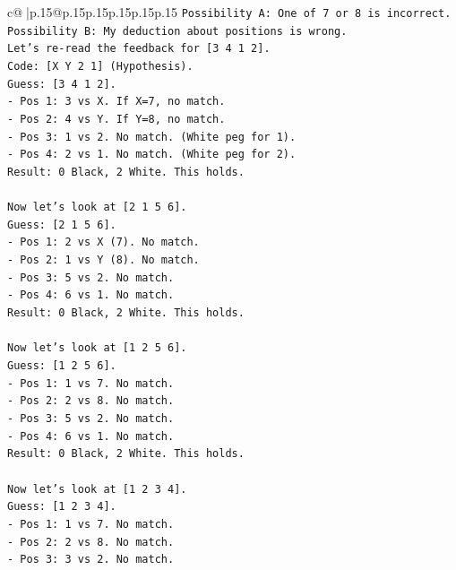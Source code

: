 \documentclass{article}
\begin{document}
{\begin{supertabular}{c@{$\;$}|p{.15\linewidth}@{}p{.15\linewidth}p{.15\linewidth}p{.15\linewidth}p{.15\linewidth}p{.15\linewidth}}
{{{\texttt{Possibility A: One of 7 or 8 is incorrect.} \\
\texttt{Possibility B: My deduction about positions is wrong.} \\
\texttt{Let's re{-}read the feedback for {[}3 4 1 2{]}.} \\
\texttt{Code: {[}X Y 2 1{]} (Hypothesis).} \\
\texttt{Guess: {[}3 4 1 2{]}.} \\
\texttt{{-} Pos 1: 3 vs X. If X=7, no match.} \\
\texttt{{-} Pos 2: 4 vs Y. If Y=8, no match.} \\
\texttt{{-} Pos 3: 1 vs 2. No match. (White peg for 1).} \\
\texttt{{-} Pos 4: 2 vs 1. No match. (White peg for 2).} \\
\texttt{Result: 0 Black, 2 White. This holds.} \\
\\ 
\texttt{Now let's look at {[}2 1 5 6{]}.} \\
\texttt{Guess: {[}2 1 5 6{]}.} \\
\texttt{{-} Pos 1: 2 vs X (7). No match.} \\
\texttt{{-} Pos 2: 1 vs Y (8). No match.} \\
\texttt{{-} Pos 3: 5 vs 2. No match.} \\
\texttt{{-} Pos 4: 6 vs 1. No match.} \\
\texttt{Result: 0 Black, 2 White. This holds.} \\
\\ 
\texttt{Now let's look at {[}1 2 5 6{]}.} \\
\texttt{Guess: {[}1 2 5 6{]}.} \\
\texttt{{-} Pos 1: 1 vs 7. No match.} \\
\texttt{{-} Pos 2: 2 vs 8. No match.} \\
\texttt{{-} Pos 3: 5 vs 2. No match.} \\
\texttt{{-} Pos 4: 6 vs 1. No match.} \\
\texttt{Result: 0 Black, 2 White. This holds.} \\
\\ 
\texttt{Now let's look at {[}1 2 3 4{]}.} \\
\texttt{Guess: {[}1 2 3 4{]}.} \\
\texttt{{-} Pos 1: 1 vs 7. No match.} \\
\texttt{{-} Pos 2: 2 vs 8. No match.} \\
\texttt{{-} Pos 3: 3 vs 2. No match.} \\
}}}
\end{supertabular}}
\end{document}
